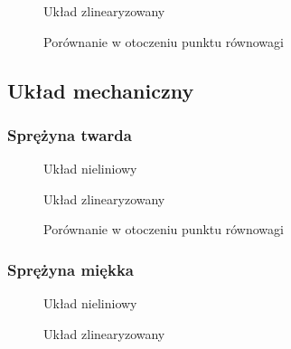 \documentclass[a4paper, 10pt]{article}
\begin{document}
				\begin{figure}[H]
					\centering
					\def \svgwidth{0.75\columnwidth}
					
					\caption{Układ zlinearyzowany}
				\end{figure}\noindent


				\begin{figure}[H]
					\centering
					\def \svgwidth{0.75\columnwidth}
					
					\caption{Porównanie w otoczeniu punktu równowagi}
				\end{figure}\noindent

		\subsection{Układ mechaniczny}
			\subsubsection{Sprężyna twarda}
				\begin{figure}[H]
					\centering
					\def \svgwidth{0.75\columnwidth}
					
					\caption{Układ nieliniowy}
				\end{figure}\noindent


				\begin{figure}[H]
					\centering
					\def \svgwidth{0.75\columnwidth}
					
					\caption{Układ zlinearyzowany}
				\end{figure}\noindent


				\begin{figure}[H]
					\centering
					\def \svgwidth{0.75\columnwidth}
					
					\caption{Porównanie w otoczeniu punktu równowagi}
				\end{figure}\noindent

			\subsubsection{Sprężyna miękka}
				\begin{figure}[H]
					\centering
					\def \svgwidth{0.75\columnwidth}
					
					\caption{Układ nieliniowy}
				\end{figure}\noindent


				\begin{figure}[H]
					\centering
					\def \svgwidth{0.75\columnwidth}
					
					\caption{Układ zlinearyzowany}
				\end{figure}\noindent
\end{document}
